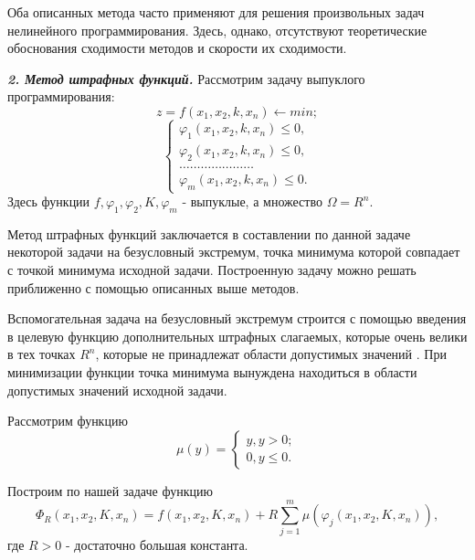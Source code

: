 {Оба описанных метода часто применяют для решения произвольных задач нелинейного программирования. Здесь, однако, отсутствуют теоретические обоснования сходимости методов и скорости их сходимости.

\textbf{\textit{2. Метод штрафных функций.}} Рассмотрим задачу выпуклого программирования:
\begin{equation*}
z = f(x_{1}, x_{2}, k, x_{n}) \leftarrow min;
\end{equation*}
\begin{equation*}
\begin{cases}
\varphi_{1}(x_{1}, x_{2}, k, x_{n}) \leq 0,
\\
\varphi_{2}(x_{1}, x_{2}, k, x_{n}) \leq 0,
\\
\dots \dots \dots \dots \dots \dots \dots
\\
\varphi_{m}(x_{1}, x_{2}, k, x_{n}) \leq 0.
\end{cases}
\end{equation*}
Здесь функции $f, \varphi_{1},  \varphi_{2}, K, \varphi_{m}$ - выпуклые, а множество 	$\Omega=R^{n}.$

Метод штрафных функций заключается в составлении по данной задаче некоторой задачи на безусловный экстремум, точка минимума которой совпадает с точкой минимума исходной задачи. Построенную
задачу можно решать приближенно с помощью описанных выше методов.

Вспомогательная задача на безусловный экстремум строится с  помощью введения в целевую функцию дополнительных штрафных слагаемых, которые очень велики в тех точках $R^{n}$, которые не принадлежат области допустимых значений  . При минимизации функции точка минимума вынуждена находиться в области допустимых значений исходной задачи.

Рассмотрим функцию
\begin{equation*}
\mu (y) =
\begin{cases}
y, y > 0;
\\
0, y \leq 0.
\end{cases}
\end{equation*}

Построим по нашей задаче функцию
\begin{equation*}
\Phi_{R} (x_{1}, x_{2}, K, x_{n}) = f(x_{1}, x_{2}, K, x_{n}) + R\sum_{j=1}^{m}\mu(\varphi_{j}(x_{1}, x_{2}, K, x_{n})),
\end{equation*}
где $R>0$ - достаточно большая константа.


}
